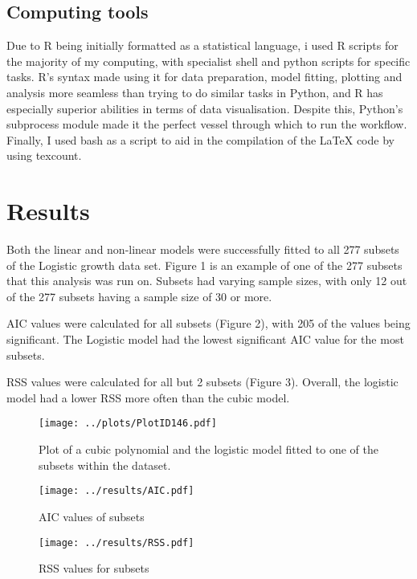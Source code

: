\documentclass[11pt, titlepage]{article}
\begin{document}
    \subsection*{Computing tools}
	Due to R being initially formatted as a statistical language, i used R scripts for the majority of my computing, with specialist shell and python scripts for specific tasks. R's syntax made using it for data preparation, model fitting, plotting and analysis more seamless than trying to do similar tasks in Python, and R has especially superior abilities in terms of data visualisation. Despite this, Python's subprocess module made it the perfect vessel through which to run the workflow. Finally, I used bash as a script to aid in the compilation of the LaTeX code by using texcount. 
    

    \section*{Results}

	Both the linear and non-linear models were successfully fitted to all 277 subsets of the Logistic growth data set. Figure 1 is an example of one of the 277 subsets that this analysis was run on. Subsets had varying sample sizes, with only 12 out of the 277 subsets having a sample size of 30 or more. 
	
	
	AIC values were calculated for all subsets (Figure 2), with 205 of the values being significant. The Logistic model had the lowest significant AIC value for the most subsets.
	
	RSS values were calculated for all but 2 subsets (Figure 3). Overall, the logistic model had a lower RSS more often than the cubic model. 


    \begin{figure}[H]
    \centering
    \texttt{[image: ../plots/PlotID146.pdf]}
    \caption{Plot of a cubic polynomial and the logistic model fitted to one of the subsets within the dataset.}
    \end{figure}

    \begin{figure}[H]
    \centering
    \texttt{[image: ../results/AIC.pdf]}
    \caption{AIC values of subsets}
    \end{figure}

       \begin{figure}[H]
    \centering
    \texttt{[image: ../results/RSS.pdf]}
    \caption{RSS values for subsets}
    \end{figure}
\end{document}
